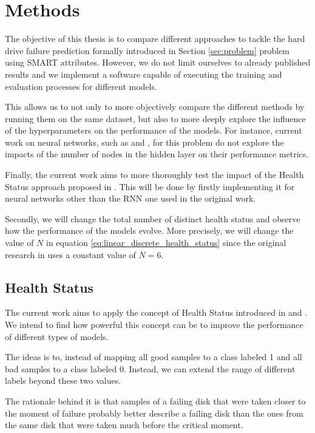 \chapter{Methods}\label{chap:methods}

The objective of this thesis is to compare different approaches to tackle the hard drive failure prediction formally introduced in Section \ref{sec:problem} problem using SMART attributes.
However, we do not limit ourselves to already published results and we implement a software capable of executing the training and evaluation processes for different models.

This allows us to not only to more objectively compare the different methods by running them on the same dataset, but also to more deeply explore the influence of the hyperparameters on the performance of the models.
For instance, current work on neural networks, such as \cite{Zhu13} and \cite{Xu16}, for this problem do not explore the impacts of the number of nodes in the hidden layer on their performance metrics.

Finally, the current work aims to more thoroughly test the impact of the Health Status approach proposed in \cite{Xu16}.
This will be done by firstly implementing it for neural networks other than the RNN one used in the original work.

Secondly, we will change the total number of distinct health status and observe how the performance of the models evolve.
More precisely, we will change the value of $N$ in equation \ref{eq:linear_discrete_health_status} since the original research in \cite{Xu16} uses a constant value of $N = 6$.

\section{Health Status}\label{sec:health_status}

The current work aims to apply the concept of Health Status introduced in \cite{Xu16} and \cite{Li14}.
We intend to find how powerful this concept can be to improve the performance of different types of models.

The ideas is to, instead of mapping all good samples to a class labeled 1 and all bad samples to a class labeled 0.
Instead, we can extend the range of different labels beyond these two values.

The rationale behind it is that samples of a failing disk that were taken closer to the moment of failure probably better describe a failing disk than the ones from the same disk that were taken much before the critical moment.


